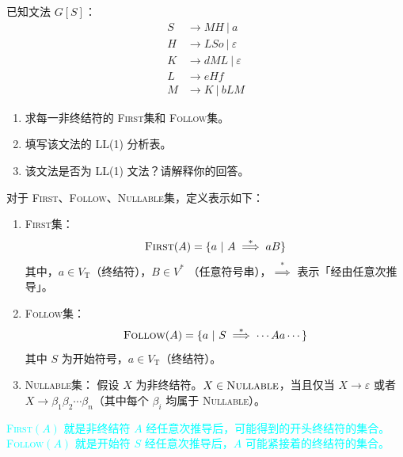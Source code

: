 \documentclass[UTF8]{ctexart}
\newcommand\FIRST{\textsc{First}}
\newcommand\FOLLOW{\textsc{Follow}}
\newcommand\NULLABLE{\textsc{Nullable}}
\newcommand\VN{V_{\mathrm{N}}} %
\newcommand\VT{V_{\mathrm{T}}} %
\newcommand\deduceone{\overset{+}{\implies}} %
\newcommand\deduce{\overset{*}{\implies}} %
\begin{document}
{\color{cyan!50!black}
已知文法 $G[S]$：
\begin{align*}
  S &\to MH \ |\  a \\
  H &\to LSo \ |\  \varepsilon \\
  K &\to dML \ |\  \varepsilon \\
  L &\to eHf \\
  M &\to K \ |\  bLM
\end{align*}
\begin{enumerate}[itemsep=0pt,parsep=0pt]
    \item 求每一非终结符的 \FIRST 集和 \FOLLOW 集。
    \item 填写该文法的 LL(1) 分析表。
    \item 该文法是否为 LL(1) 文法？请解释你的回答。 
\end{enumerate}
}

\begin{tcolorbox}[colback=violet!5, colframe=violet, boxrule=1pt, ]
%

对于 \FIRST、\FOLLOW、\NULLABLE 集，定义表示如下：
\begin{enumerate}
  \item \FIRST 集：
    \begin{equation*}
      \FIRST(A) = \{a\ |\ A\deduce aB\}
    \end{equation*}
    其中，$a\in \VT$（终结符），$B \in V^*$ （任意符号串），$\deduce$ 表示「经由任意次推导」。
  \item \FOLLOW 集：
    \begin{equation*}
      \FOLLOW(A) = \{a\ |\ S\deduce \cdots Aa\cdots \}
    \end{equation*}
    其中 $S$ 为开始符号，$a\in \VT$（终结符）。
  \item \NULLABLE 集：
    假设 $X$ 为非终结符。$X\in \NULLABLE$，当且仅当 $X\to \varepsilon$ 或者 $X\to \beta_1\beta_2\cdots\beta_n$（其中每个 $\beta_i$ 均属于 \NULLABLE）。
\end{enumerate}

\textcolor{cyan}{\FIRST$(A)$ 就是非终结符 $A$ 经任意次推导后，可能得到的开头终结符的集合。\FOLLOW$(A)$ 就是开始符 $S$ 经任意次推导后，$A$ 可能紧接着的终结符的集合。}

\end{tcolorbox}
\end{document}
